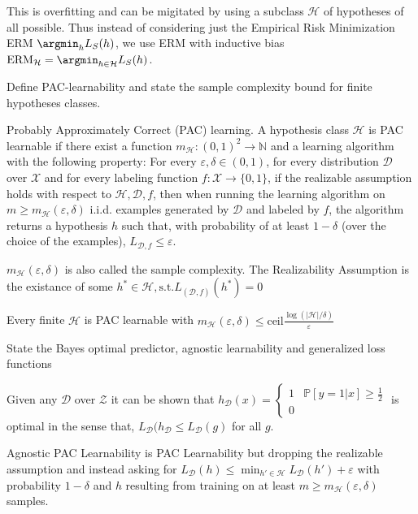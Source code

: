 \documentclass[11pt,a4paper,twoside]{article}
\begin{document}
This is overfitting and can be migitated by using a subclass \( \mathcal{H} \) of hypotheses of all possible. 
Thus instead of considering just the Empirical Risk Minimization ERM
\( \argmin_h L_S(h) \), we use ERM with inductive bias \( \text{ERM}_{\mathcal{H}} = \argmin_{h \in \mathcal{H}} L_S(h) \).


Define PAC-learnability and state the sample complexity bound for finite hypotheses classes.

Probably Approximately Correct (PAC) learning.
A hypothesis class \( \mathcal{H} \) is PAC learnable
if there exist a function \( m_{\mathcal{H}} : (0, 1)^2 \to \mathbb{N} \) and a learning algorithm with the
following property: For every \(\varepsilon, δ ∈ (0, 1)\), for every distribution \( \mathcal{D} \) over \( \mathcal{X} \) 
and for every labeling function \( f : \mathcal{X} \to \{0, 1\}\), if the realizable assumption holds
with respect to \( \mathcal{H}, \mathcal{D},f \), then when running the learning algorithm on \( m \geq m_{\mathcal{H}}(\varepsilon, \delta) \)
i.i.d. examples generated by \( \mathcal{D} \) and labeled by \( f \), the algorithm returns
a hypothesis \( h \) such that, with probability of at least \( 1 − δ \) (over the choice of the examples), 
\( L_{\mathcal{D},f} \leq \varepsilon \).

\( m_{\mathcal{H}}(\varepsilon, \delta) \) is also called the sample complexity.
The Realizability Assumption is the existance of some \( h^\ast \in \mathcal{H}, \text{s.t.} L_{(\mathcal{D},f)}(h^\ast) = 0 \)

Every finite \( \mathcal{H} \) is PAC learnable with 
\( m_{\mathcal{H}}(\varepsilon, \delta) \leq \text{ceil} \frac{\log(|\mathcal{H}|/\delta)}{\varepsilon} \)



State the Bayes optimal predictor, agnostic learnability and generalized loss functions

Given any \( \mathcal{D} \) over \( \mathcal{Z} \) it can be shown that
\( h_{\mathcal{D}}(x) = \begin{cases}
  1 & \mathbb{P}[y = 1|x] \geq \frac{1}{2} \\
  0
\end{cases} \)
is optimal in the sense that, \( L_{\mathcal{D}}(h_{\mathcal{D}} \leq L_{\mathcal{D}}(g) \) for all \( g \).

Agnostic PAC Learnability
is PAC Learnability but dropping the realizable assumption and instead asking for
\( L_{\mathcal{D}}(h) \leq \min_{h' \in \mathcal{H}} L_{\mathcal{D}}(h') + \varepsilon \)
with probability \( 1 - \delta \) and \( h \) resulting from training on at least \( m \geq m_{\mathcal{H}}(\varepsilon, \delta)\) samples.
\end{document}
